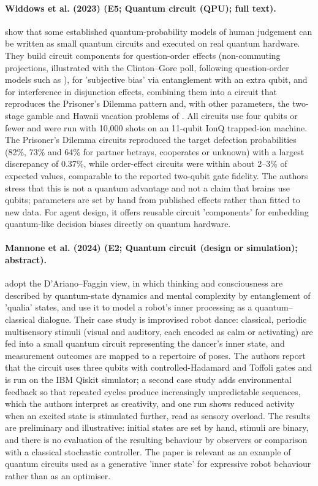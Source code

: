 \documentclass[10pt,a4paper]{article}
\begin{document}
\paragraph{Widdows et al. (2023) (E5; Quantum circuit (QPU); full text).} \citet{Widdows2023} show that some established quantum-probability models of human judgement can be written as small quantum circuits and executed on real quantum hardware. They build circuit components for question-order effects (non-commuting projections, illustrated with the Clinton--Gore poll, following question-order models such as \citep{Wang2014}), for 'subjective bias' via entanglement with an extra qubit, and for interference in disjunction effects, combining them into a circuit that reproduces the Prisoner's Dilemma pattern and, with other parameters, the two-stage gamble and Hawaii vacation problems of \citep{Shafir1992}. All circuits use four qubits or fewer and were run with 10,000 shots on an 11-qubit IonQ trapped-ion machine. The Prisoner's Dilemma circuits reproduced the target defection probabilities (82\%, 73\% and 64\% for partner betrays, cooperates or unknown) with a largest discrepancy of 0.37\%, while order-effect circuits were within about 2--3\% of expected values, comparable to the reported two-qubit gate fidelity. The authors stress that this is not a quantum advantage and not a claim that brains use qubits; parameters are set by hand from published effects rather than fitted to new data. For agent design, it offers reusable circuit 'components' for embedding quantum-like decision biases directly on quantum hardware.

\paragraph{Mannone et al. (2024) (E2; Quantum circuit (design or simulation); abstract).} \citet{Mannone2024} adopt the D'Ariano--Faggin view, in which thinking and consciousness are described by quantum-state dynamics and mental complexity by entanglement of 'qualia' states, and use it to model a robot's inner processing as a quantum--classical dialogue. Their case study is improvised robot dance: classical, periodic multisensory stimuli (visual and auditory, each encoded as calm or activating) are fed into a small quantum circuit representing the dancer's inner state, and measurement outcomes are mapped to a repertoire of poses. The authors report that the circuit uses three qubits with controlled-Hadamard and Toffoli gates and is run on the IBM Qiskit simulator; a second case study adds environmental feedback so that repeated cycles produce increasingly unpredictable sequences, which the authors interpret as creativity, and one run shows reduced activity when an excited state is stimulated further, read as sensory overload. The results are preliminary and illustrative: initial states are set by hand, stimuli are binary, and there is no evaluation of the resulting behaviour by observers or comparison with a classical stochastic controller. The paper is relevant as an example of quantum circuits used as a generative 'inner state' for expressive robot behaviour rather than as an optimiser.
\end{document}
